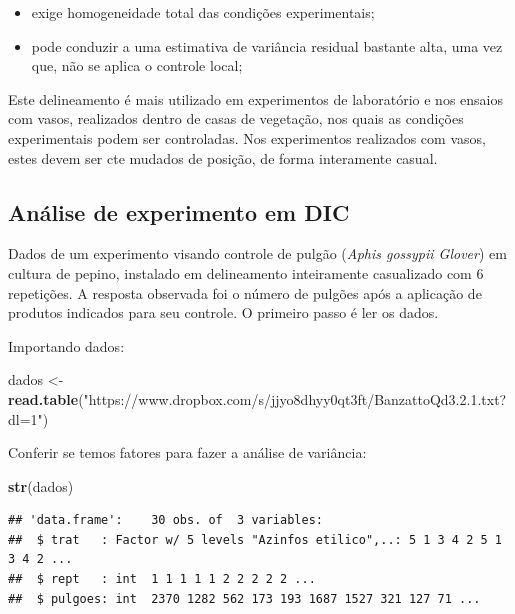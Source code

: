\documentclass[
]{book}
\newenvironment{Shaded}{\begin{snugshade}}{\end{snugshade}}
\newcommand{\KeywordTok}[1]{\textcolor[rgb]{0.13,0.29,0.53}{\textbf{#1}}}
\newcommand{\NormalTok}[1]{#1}
\newcommand{\StringTok}[1]{\textcolor[rgb]{0.31,0.60,0.02}{#1}}
\providecommand{\tightlist}{%
  \setlength{\itemsep}{0pt}\setlength{\parskip}{0pt}}
\begin{document}
\begin{itemize}
\tightlist
\item
  exige homogeneidade total das condições experimentais;
\item
  pode conduzir a uma estimativa de variância residual bastante alta, uma vez que, não se aplica o controle local;
\end{itemize}

Este delineamento é mais utilizado em experimentos de laboratório e nos ensaios com vasos, realizados dentro de casas de vegetação, nos quais as condições experimentais podem ser controladas. Nos experimentos realizados com vasos, estes devem ser cte mudados de posição, de forma interamente casual.

\hypertarget{anuxe1lise-de-experimento-em-dic}{%
\subsection{Análise de experimento em DIC}\label{anuxe1lise-de-experimento-em-dic}}

Dados de um experimento visando controle de pulgão (\emph{Aphis gossypii Glover}) em cultura de pepino, instalado em delineamento inteiramente casualizado com 6 repetições. A resposta observada foi o número de pulgões após a aplicação de produtos indicados para seu controle.
O primeiro passo é ler os dados.

Importando dados:

\begin{Shaded}
\begin{Highlighting}[]
\NormalTok{dados <-}\StringTok{ }\KeywordTok{read.table}\NormalTok{(}\StringTok{"https://www.dropbox.com/s/jjyo8dhyy0qt3ft/BanzattoQd3.2.1.txt?dl=1"}\NormalTok{) }
\end{Highlighting}
\end{Shaded}

Conferir se temos fatores para fazer a análise de variância:

\begin{Shaded}
\begin{Highlighting}[]
\KeywordTok{str}\NormalTok{(dados)}
\end{Highlighting}
\end{Shaded}

\begin{verbatim}
## 'data.frame':    30 obs. of  3 variables:
##  $ trat   : Factor w/ 5 levels "Azinfos etilico",..: 5 1 3 4 2 5 1 3 4 2 ...
##  $ rept   : int  1 1 1 1 1 2 2 2 2 2 ...
##  $ pulgoes: int  2370 1282 562 173 193 1687 1527 321 127 71 ...
\end{verbatim}
\end{document}
